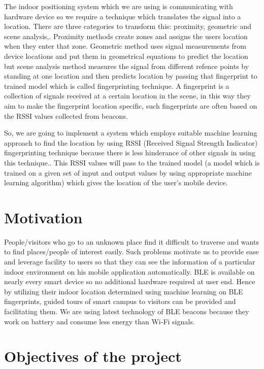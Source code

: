 The indoor positioning system which we are using is communicating with hardware device so we require a technique which translates the signal into a location. There are three categories to transform this: proximity, geometric and scene analysis,. Proximity methods create zones and assigns the users location when they enter that zone. Geometric method uses signal measurements from device locations and put them in geometrical equations to predict the location but scene analysis method measures the signal from different refence points by standing at one location and then predicts location by passing that fingerprint to trained model which is called fingerprinting technique. A fingerprint is
a collection of signals received at a certain location in the scene, in this way they aim to make the fingerprint
location specific, such fingerprints are often based on the RSSI values collected from beacons.

So, we are going to implement a system which employs suitable machine learning approach to find the location by using RSSI (Received Signal Strength Indicator) fingerprinting technique because there is less hinderance of other signals in using this technique.. This RSSI values will pass to the trained model (a model which is trained on a given set of input and output values by using appropriate machine learning algorithm) which gives the location of the user's mobile device.



\section{Motivation} 
People/visitors who go to an unknown place find it difficult to traverse and wants to find places/people of interest easily. Such problems motivate us to provide ease and leverage facility to users so that they can see the information of a particular indoor environment on his mobile application automatically. BLE is available on nearly every smart device so no additional hardware required at user end. Hence by utilizing their indoor location determined using machine learning on BLE fingerprints, guided tours of smart campus to visitors can be provided and facilitating them. We are using latest technology of BLE beacons because they work on battery and consume less energy than Wi-Fi signals\cite{hultgren2015evaluating}.

\section{Objectives of the project}
